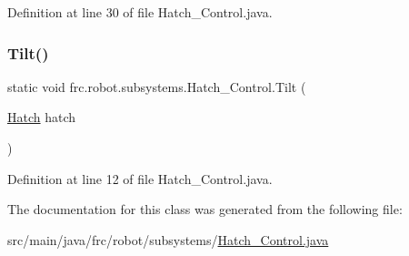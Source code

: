 Definition at line 30 of file Hatch\+\_\+\+Control.\+java.

\mbox{\label{classfrc_1_1robot_1_1subsystems_1_1_hatch___control_a10439efd71fc486d24b95364d70dcde3}} 
\subsubsection{\texorpdfstring{Tilt()}{Tilt()}}
{\footnotesize\ttfamily static void frc.\+robot.\+subsystems.\+Hatch\+\_\+\+Control.\+Tilt (\begin{DoxyParamCaption}\item[{\hyperlink{enumfrc_1_1robot_1_1_enums_1_1_hatch}{Hatch}}]{hatch }\end{DoxyParamCaption})\hspace{0.3cm}{\ttfamily [static]}}



Definition at line 12 of file Hatch\+\_\+\+Control.\+java.



The documentation for this class was generated from the following file\+:\begin{DoxyCompactItemize}
\item 
src/main/java/frc/robot/subsystems/\hyperlink{_hatch___control_8java}{Hatch\+\_\+\+Control.\+java}\end{DoxyCompactItemize}
